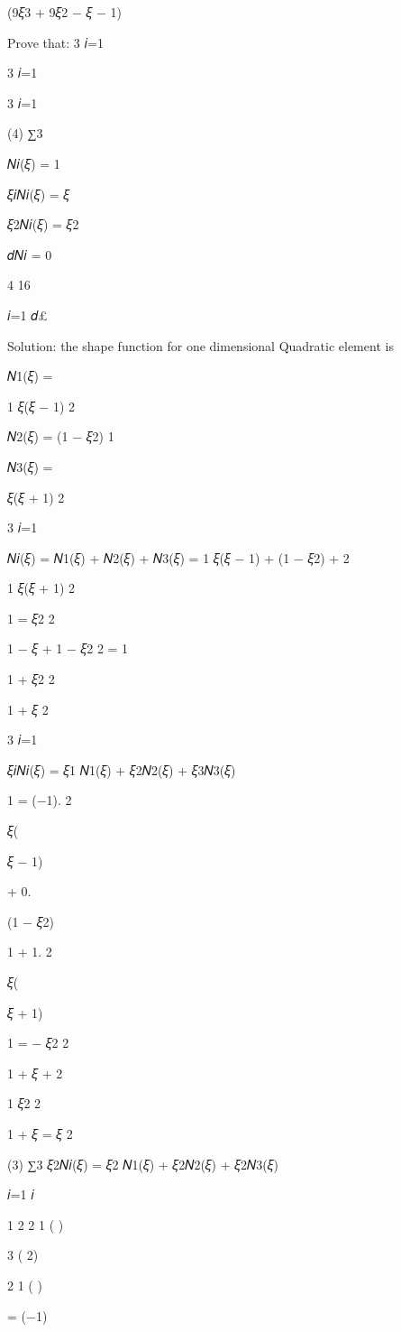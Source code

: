 {{{{(9𝜉3 + 9𝜉2 − 𝜉 − 1)
 

Prove that:
3
𝑖=1

3
𝑖=1

3
𝑖=1

(4) ∑3
 



𝑁𝑖(𝜉) = 1

𝜉𝑖𝑁𝑖(𝜉) = 𝜉

𝜉2𝑁𝑖(𝜉) = 𝜉2

𝑑𝑁𝑖 = 0
 
 
4	16
 
𝑖=1 𝑑£

Solution: the shape function for one dimensional Quadratic element is

 
𝑁1(𝜉) =
 
1
  𝜉(𝜉 − 1)
2
 
𝑁2(𝜉) = (1 − 𝜉2)
1
 
𝑁3(𝜉) =
 
  𝜉(𝜉 + 1)
2
 
3
𝑖=1
 
𝑁𝑖(𝜉) = 𝑁1(𝜉) + 𝑁2(𝜉) + 𝑁3(𝜉)
= 1 𝜉(𝜉 − 1) + (1 − 𝜉2) +
2
 


1
  𝜉(𝜉 + 1)
2
 
1
=   𝜉2
2
 
1
−   𝜉 + 1 − 𝜉2
2
= 1
 
1
+   𝜉2
2
 
1
+   𝜉 2
 

 
3
𝑖=1
 
𝜉𝑖𝑁𝑖(𝜉) = 𝜉1 𝑁1(𝜉) + 𝜉2𝑁2(𝜉) + 𝜉3𝑁3(𝜉)
 

 
1
= (−1).  
2
 
𝜉(
 
𝜉 − 1)
 
+ 0.
 
(1 − 𝜉2)
 
1
+ 1.  
2
 
𝜉(
 
𝜉 + 1)
 
1
= −   𝜉2
2
 
1
+   𝜉 + 2
 
1 𝜉2
2
 
1
+   𝜉 = 𝜉 2
 
(3)	∑3	𝜉2𝑁𝑖(𝜉) = 𝜉2 𝑁1(𝜉) + 𝜉2𝑁2(𝜉) + 𝜉2𝑁3(𝜉)
 
𝑖=1  𝑖
 
1	2
2 1  (	)
 
3
(	2)
 
2 1  (	)
 
= (−1)
 
}}}}
